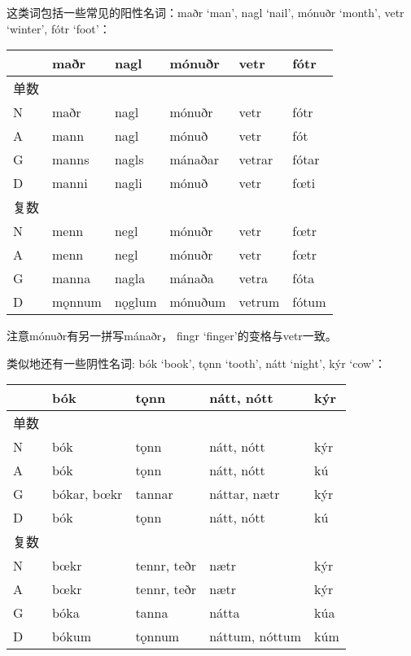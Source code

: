 这类词包括一些常见的阳性名词：maðr `man', nagl `nail', mónuðr `month',
vetr `winter', fótr `foot'：

\begin{longtable}{llllll}
  \toprule
       & maðr   & nagl   & mónuðr  & vetr   & fótr  \\
  \midrule
  \endhead
  \bottomrule
  \endfoot
  单数 &        &        &         &        &       \\
  N    & maðr   & nagl   & mónuðr  & vetr   & fótr  \\
  A    & mann   & nagl   & mónuð   & vetr   & fót   \\
  G    & manns  & nagls  & mánaðar & vetrar & fótar \\
  D    & manni  & nagli  & mónuð   & vetr   & fœti  \\
  复数 &        &        &         &        &       \\
  N    & menn   & negl   & mónuðr  & vetr   & fœtr  \\
  A    & menn   & negl   & mónuðr  & vetr   & fœtr  \\
  G    & manna  & nagla  & mánaða  & vetra  & fóta  \\
  D    & mǫnnum & nǫglum & mónuðum & vetrum & fótum \\
\end{longtable}

注意mónuðr有另一拼写mánaðr， fingr `finger‌'的变格与vetr一致。

类似地还有一些阴性名词: bók `book', tǫnn `tooth', nátt `night', kýr
`cow'：

\begin{longtable}{lllll}
  \toprule
       & bók         & tǫnn        & nátt, nótt     & kýr \\
  \midrule
  \endhead
  \bottomrule
  \endfoot
  单数 &             &             &                &     \\
  N    & bók         & tǫnn        & nátt, nótt     & kýr \\
  A    & bók         & tǫnn        & nátt, nótt     & kú  \\
  G    & bókar, bœkr & tannar      & náttar, nætr   & kýr \\
  D    & bók         & tǫnn        & nátt, nótt     & kú  \\
  复数 &             &             &                &     \\
  N    & bœkr        & tennr, teðr & nætr           & kýr \\
  A    & bœkr        & tennr, teðr & nætr           & kýr \\
  G    & bóka        & tanna       & nátta          & kúa \\
  D    & bókum       & tǫnnum      & náttum, nóttum & kúm \\
\end{longtable}

